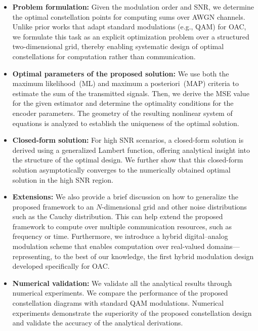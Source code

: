 \documentclass[journal,12pt,onecolumn,draftclsnofoot]{IEEEtran}
\theoremstyle{definition}
\begin{document}
\begin{itemize}
    \item \textbf{Problem formulation:}  Given the modulation order and SNR, we determine the optimal constellation points for computing sums over AWGN channels. Unlike prior works that adapt standard modulations (e.g., QAM) for OAC, we formulate this task as an explicit optimization problem over a structured two-dimensional grid, thereby enabling systematic design of optimal constellations for computation rather than communication. 
    \item \textbf{Optimal parameters of the proposed solution:} We use both the maximum likelihood~(ML) and maximum a posteriori~(MAP) criteria to estimate the sum of the transmitted signals.  Then, we derive the MSE value for the given estimator and determine the optimality conditions for the encoder parameters. The geometry of the resulting nonlinear system of equations is analyzed to establish the uniqueness of the optimal solution. 
    \item \textbf{Closed-form solution:} For high SNR scenarios, a closed-form solution is derived using a generalized Lambert function, offering analytical insight into the structure of the optimal design. We further show that this closed-form solution asymptotically converges to the numerically obtained optimal solution in the high SNR region.
    \item \textbf{Extensions:} We also provide a brief discussion on how to generalize the proposed framework to an $N$-dimensional grid and other noise distributions such as the Cauchy distribution. This can help extend the proposed framework to compute over multiple communication resources, such as frequency or time.  Furthermore, we introduce a hybrid digital–analog modulation scheme that enables computation over real-valued domains—representing, to the best of our knowledge, the first hybrid modulation design developed specifically for OAC. 
    \item \textbf{Numerical validation:} We validate all the analytical results through numerical experiments.  We compare the performance of the proposed constellation diagrams with standard QAM modulations. Numerical experiments demonstrate the superiority of the proposed constellation design and validate the accuracy of the analytical derivations.
\end{itemize}






\end{document}
